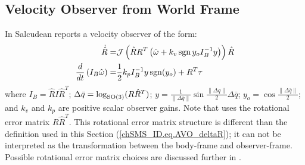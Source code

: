 \subsection {Velocity Observer from World Frame}
\label{chSMS_ID.sec.AVO_Sal}

In \cite{Salcudean1991} Salcudean reports a velocity observer of the form:
%
\begin{align}\label{chSMS_ID.eq.AVO_Sal}
\dot{\hat{R}}=&\mathcal{J}\left(\hat{R} R^T \left(\hat{\omega}
               +k_v\operatorname{sgn}{y_o}I_B^{-1}y \right)\right) \hat{R} 
                                                          \nonumber \\
\frac{d}{dt}\left(I_B\hat{\omega}\right) 
  =&\frac{1}{2}k_pI_B^{-1}y\operatorname{sgn}(y_o)+R^T \tau
\end{align}
%
\noindent where $I_B=\hat{R} I \hat{R}^T$; $\Delta
\bar{q}=\log_{\SO3}(R \hat{R}^T)$; $y=\frac{1}{\|\Delta
  \bar{q}\|}\sin{\frac{\|\Delta q\|}{2}}\Delta \bar{q}$;
$y_o=\cos{\frac{\|\Delta \bar{q}\|}{2}}$; and  $k_v$ and $k_p$ are
positive scalar observer gains.  
%
Note that \cite{Salcudean1991} uses the rotational error matrix
$R\hat{R}^T$. This rotational error matrix structure is different than
the definition used in this Section (\ref{chSMS_ID.eq.AVO_deltaR}); it
can not be interpreted as the transformation between the body-frame
and observer-frame. Possible rotational error matrix choices are
discussed further in \cite{bullo1995_SE3_PD}.


